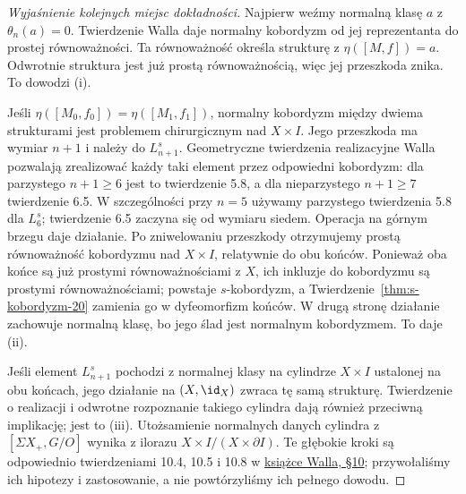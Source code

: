 \begin{proof}[Wyjaśnienie kolejnych miejsc dokładności]
Najpierw weźmy normalną klasę $a$
z $\theta_n(a)=0$. Twierdzenie Walla
daje normalny kobordyzm od jej
reprezentanta do prostej równoważności.
Ta równoważność określa strukturę
z $\eta([M,f])=a$. Odwrotnie struktura
jest już prostą równoważnością,
więc jej przeszkoda znika.
To dowodzi (i).

Jeśli $\eta([M_0,f_0])=\eta([M_1,f_1])$,
normalny kobordyzm między dwiema
strukturami jest problemem chirurgicznym
nad $X\times I$. Jego przeszkoda ma
wymiar $n+1$ i należy do $L_{n+1}^s$.
Geometryczne twierdzenia realizacyjne
Walla pozwalają zrealizować każdy taki
element przez odpowiedni kobordyzm:
dla parzystego $n+1\geq6$ jest to
twierdzenie 5.8, a dla nieparzystego
$n+1\geq7$ twierdzenie 6.5.
W szczególności przy $n=5$ używamy
parzystego twierdzenia 5.8 dla $L_6^s$;
twierdzenie 6.5 zaczyna się od wymiaru siedem.
Operacja na górnym brzegu daje działanie.
Po zniwelowaniu przeszkody otrzymujemy prostą
równoważność kobordyzmu nad $X\times I$,
relatywnie do obu końców. Ponieważ oba końce
są już prostymi równoważnościami z $X$,
ich inkluzje do kobordyzmu są prostymi
równoważnościami; powstaje $s$-kobordyzm, a
Twierdzenie~\ref{thm:s-kobordyzm-20}
zamienia go w dyfeomorfizm końców.
W drugą stronę działanie zachowuje
normalną klasę, bo jego ślad jest
normalnym kobordyzmem. To daje (ii).

Jeśli element $L_{n+1}^s$ pochodzi
z normalnej klasy na cylindrze
$X\times I$ ustalonej na obu końcach,
jego działanie na $(X,\id_X)$
zwraca tę samą strukturę.
Twierdzenie o realizacji i
odwrotne rozpoznanie takiego
cylindra dają również przeciwną
implikację; jest to (iii).
Utożsamienie normalnych danych cylindra
z $[\Sigma X_+,G/O]$ wynika
z ilorazu $X\times I/(X\times\partial I)$.
Te głębokie kroki są odpowiednio
twierdzeniami 10.4, 10.5 i 10.8 w
\href{https://webhomes.maths.ed.ac.uk/~v1ranick/books/scm.pdf}
{książce Walla, §10}; przywołaliśmy
ich hipotezy i zastosowanie, a nie
powtórzyliśmy ich pełnego dowodu.
\end{proof}

